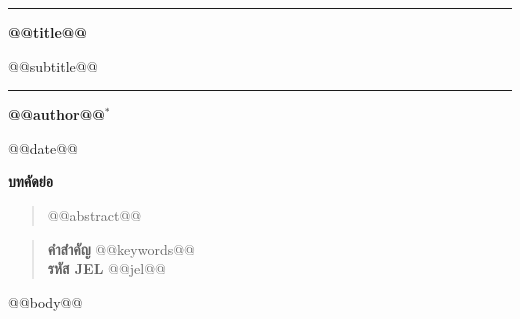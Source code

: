 \documentclass[11pt]{article}
\begin{document}
\thispagestyle{plain}
\begin{center}
\vspace*{-0.25in}
\rule{\textwidth}{2.5pt}\par\vspace{12pt}
{\LARGE\bfseries @@title@@\par}\vspace{8pt}
{\large @@subtitle@@\par}
\vspace{10pt}\rule{\textwidth}{0.8pt}\par\vspace{18pt}
{\large\bfseries @@author@@$^{\ast}$\par}\vspace{6pt}
{\normalsize @@date@@\par}
\end{center}
{\renewcommand{\thefootnote}{\fnsymbol{footnote}}}
\vspace{6pt}
\begin{center}{\large\bfseries บทคัดย่อ}\end{center}
\vspace{-4pt}
\begin{quote}\small
@@abstract@@
\end{quote}
\begin{quote}\small
\textbf{คำสำคัญ} @@keywords@@\\[3pt]
\textbf{รหัส JEL} @@jel@@
\end{quote}
\vspace{4pt}

@@body@@
\end{document}
